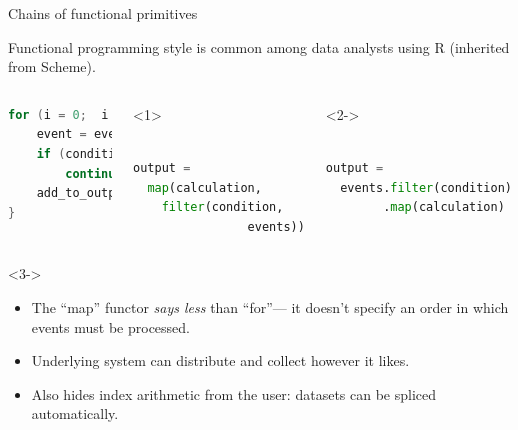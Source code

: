 \documentclass{beamer}
\begin{document}
\begin{frame}[fragile]{Chains of functional primitives}

Functional programming style is common among data analysts using R (inherited from Scheme).

\vspace{0.2 cm}

\vspace{0.2 cm}
\begin{columns}
\begin{lstlisting}[language=c,frame=single]
for (i = 0;  i < nEvents;  i++) {
    event = events(i);
    if (condition(event))
        continue;
    add_to_output(calculation(event));
}
\end{lstlisting}
\begin{onlyenv}<1>
\begin{lstlisting}[language=python,frame=single]

output = 
  map(calculation,
    filter(condition,
                events))

\end{lstlisting}
\end{onlyenv}
\begin{onlyenv}<2->
\begin{lstlisting}[language=python,frame=single]

output =
  events.filter(condition)
        .map(calculation)


\end{lstlisting}
\end{onlyenv}
\end{columns}

\begin{uncoverenv}<3->
\begin{itemize}
\item The ``map'' functor {\it says less} than ``for''--- it doesn't specify an order in which events must be processed.
\item Underlying system can distribute and collect however it likes.
\item Also hides index arithmetic from the user: datasets can be spliced automatically.
\end{itemize}
\end{uncoverenv}
\end{frame}

\end{document}

